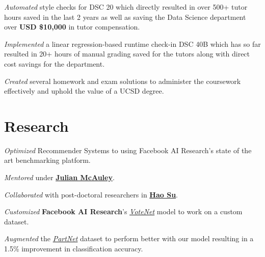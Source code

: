 \documentclass[]{devanshu-resume-openfont}
\begin{document}
\begin{minipage}[t]{0.66\textwidth}
\vspace{\topsep} %
\begin{tightemize}
\item \emph{Automated} style checks for DSC 20 which directly resulted in over
    500+ tutor hours saved in the last 2 years as well as saving the Data
    Science department over \textbf{USD \$10,000} in tutor compensation.
\item \emph{Implemented} a linear regression-based runtime check-in DSC 40B which has so far resulted in 20+ hours of manual grading saved for the tutors along with direct cost savings for the department.
\item \emph{Created} several homework and exam solutions to administer the coursework effectively and uphold the value of a UCSD degree.
\end{tightemize}
\sectionsep

\section{Research}
\begin{tightemize}
\item \emph{Optimized} Recommender Systems to using Facebook AI Research's
    state of the art benchmarking platform.
\item \emph{Mentored} under
    \textbf{\href{https://scholar.google.com/citations?user=icbo4M0AAAAJ&hl=en}{Julian McAuley}}.
\end{tightemize}
\sectionsep

\begin{tightemize}
\item \emph{Collaborated} with post-doctoral researchers in \textbf{\href{https://scholar.google.com/citations?user=1P8Zu04AAAAJ}{Hao Su}}.
\item \emph{Customized} \textbf{Facebook AI Research}'s \emph{\href{https://arxiv.org/abs/1904.09664}{VoteNet}} model to work on a custom dataset.
\item \emph{Augmented} the
    \emph{\href{https://cs.stanford.edu/~kaichun/partnet/}{PartNet}} dataset to
    perform better with our model resulting in a 1.5\% improvement in classification accuracy.
\end{tightemize}
\sectionsep


\end{minipage}
\end{document}
